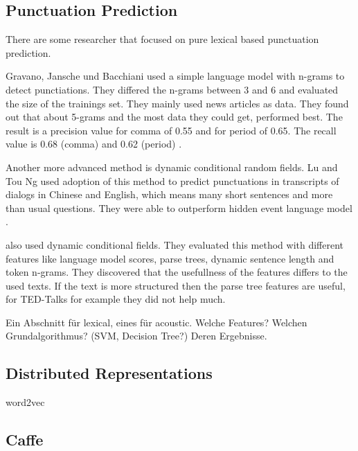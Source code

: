 
\subsection{Punctuation Prediction}
There are some researcher that focused on pure lexical based punctuation prediction.

Gravano, Jansche und Bacchiani used a simple language model with n-grams to detect punctiations. 
They differed the n-grams between 3 and 6 and evaluated the size of the trainings set. 
They mainly used news articles as data. They found out that about 5-grams and the most data they could get, performed best.
The result is a precision value for comma of 0.55 and for period of 0.65. 
The recall value is 0.68 (comma) and 0.62 (period) \cite{gravano09}. 


Another more advanced method is dynamic conditional random fields. 
Lu and Tou Ng used adoption of this method to predict punctuations in transcripts of dialogs in Chinese and English, which means many short sentences and more than usual questions. 
They were able to outperform hidden event language model \cite{Lu_betterpunctuation}.

\cite{DBLP:conf/interspeech/UeffingBV13} also used dynamic conditional fields. They evaluated this method with different features like language model scores, parse trees, dynamic sentence length and token n-grams. 
They discovered that the usefullness of the features differs to the used texts. If the text is more structured then the parse tree features are useful, for TED-Talks for example they did not help much.


Ein Abschnitt für lexical, eines für acoustic.
Welche Features?
Welchen Grundalgorithmus? (SVM, Decision Tree?)
Deren Ergebnisse.



\subsection{Distributed Representations}
word2vec
\subsection{Caffe}
